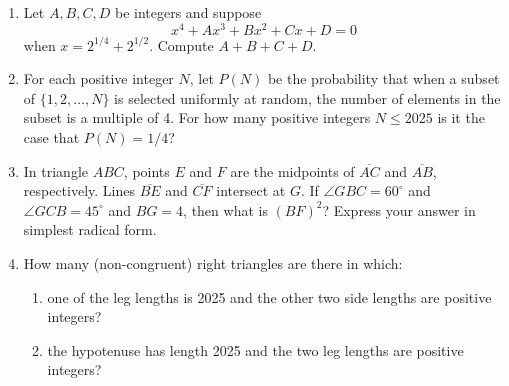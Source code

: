 \documentclass{article}
\begin{document}
\begin{enumerate}
\item Let $A,B,C,D$ be integers and suppose
\begin{equation*}
x^4 + Ax^3 + Bx^2 + Cx + D = 0
\end{equation*}
when $x = 2^{1/4} + 2^{1/2}$. Compute $A + B + C + D$.\vspace{3cm}
\item For each positive integer $N$, let $P(N)$ be the probability that when a subset of $\{1, 2, \ldots, N\}$ is selected uniformly at random, the number of elements in the subset is a multiple of 4. For how many positive integers $N\leq 2025$ is it the case that $P(N) = 1/4$?\vspace{3cm}
\item In triangle $ABC$, points $E$ and $F$ are the midpoints of $\overline{AC}$ and $\overline{AB}$, respectively. Lines $\overline{BE}$ and $\overline{CF}$ intersect at $G$. If $\angle GBC = 60^{\circ}$ and $\angle GCB = 45^{\circ}$ and $BG = 4$, then what is $(BF)^2$? Express your answer in simplest radical form.\vspace{3cm}
\item How many (non-congruent) right triangles are there in which:
\begin{enumerate}
\item one of the leg lengths is 2025 and the other two side lengths are positive integers?
\item the hypotenuse has length 2025 and the two leg lengths are positive integers?
\end{enumerate}
\end{enumerate}
\end{document}
